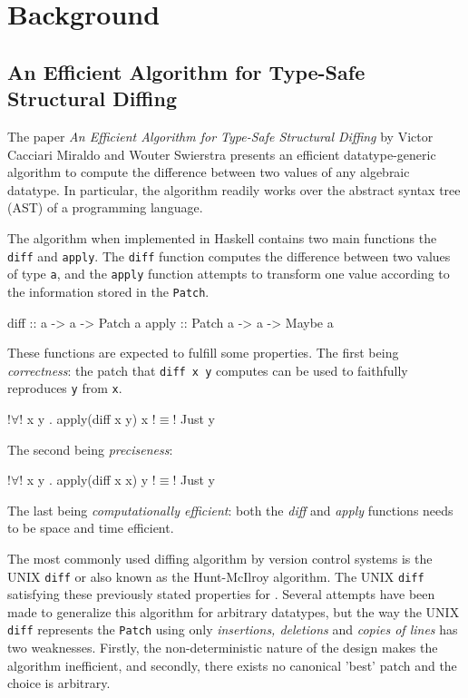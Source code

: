 \section{Background}

\subsection{An Efficient Algorithm for Type-Safe Structural Diffing}
The paper \textit{An Efficient Algorithm for Type-Safe Structural Diffing} by Victor Cacciari Miraldo and Wouter Swierstra presents an efficient datatype-generic algorithm to compute the difference between two values of any algebraic datatype. In particular, the algorithm readily works over the abstract syntax tree (AST) of a programming language\cite{miraldo2019efficient}.

The algorithm when implemented in Haskell contains two main functions the \texttt{diff} and \texttt{apply}. The \texttt{diff} function computes the difference between two values of type \texttt{a}, and the \texttt{apply} function attempts to transform one value according to the information stored in the \texttt{Patch}.
\begin{haskell}
    diff  :: a -> a -> Patch a
    apply :: Patch a -> a -> Maybe a
\end{haskell}

These functions are expected to fulfill some properties. The first being \textit{correctness}: the patch that \texttt{diff x y} computes can be used to faithfully reproduces \texttt{y} from \texttt{x}.
\begin{haskell}
    !$\forall$! x y . apply(diff x y) x !$\equiv$! Just y
\end{haskell}
The second being \textit{preciseness}:
\begin{haskell}
    !$\forall$! x y . apply(diff x x) y !$\equiv$! Just y
\end{haskell}
The last being \textit{computationally efficient}: both the \textit{diff} and \textit{apply} functions needs to be space and time efficient.

The most commonly used diffing algorithm by version control systems is the UNIX \texttt{diff}\cite{hunt1976algorithm} or also known as the Hunt-McIlroy algorithm. The UNIX \texttt{diff} satisfying these previously stated properties for \cite{miraldo2019efficient}. Several attempts have been made to generalize this algorithm for arbitrary datatypes, but the way the UNIX \texttt{diff} represents the \texttt{Patch} using only \textit{insertions, deletions} and \textit{copies of lines} has two weaknesses. Firstly, the non-deterministic nature of the design makes the algorithm inefficient, and secondly, there exists no canonical 'best' patch and the choice is arbitrary\cite{miraldo2019efficient}.

